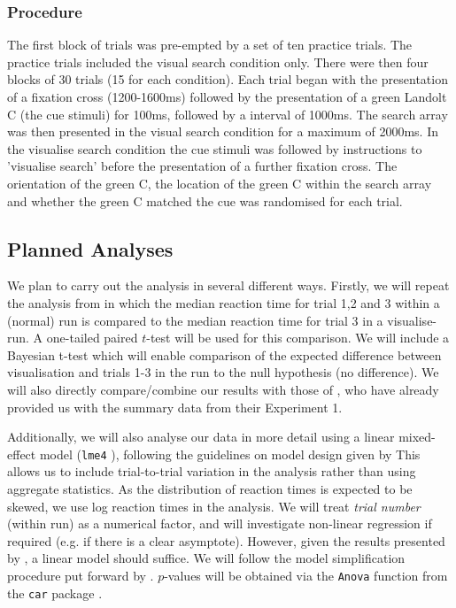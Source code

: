 \documentclass[smallextended]{svjour3}       %
\begin{document}
\subsubsection{Procedure}
The first block of trials was pre-empted by a set of ten practice trials. The practice trials included the visual search condition only. There were then four blocks of 30 trials (15 for each condition). Each trial began with the presentation of a fixation cross (1200-1600ms) followed by the presentation of a green Landolt C (the cue stimuli) for 100ms, followed by a interval of 1000ms. The search array was then presented in the visual search condition for a maximum of 2000ms. In the visualise search condition the cue stimuli was followed by instructions to 'visualise search' before the presentation of a further fixation cross. The orientation of the green C, the location of the green C within the search array and whether the green C matched the cue was randomised for each trial.

\subsection{Planned Analyses}

We plan to carry out the analysis in several different ways. Firstly, we will repeat the analysis from \cite{reinhart2015} in which the median reaction time for trial 1,2 and 3 within a (normal) run is compared to the median reaction time for trial 3 in a visualise-run. A one-tailed paired $t$-test will be used for this comparison. We will include a Bayesian t-test which will enable comparison of the expected difference between visualisation and trials 1-3 in the run to the null hypothesis (no difference). We will also directly compare/combine our results with those of \cite{reinhart2015}, who have already provided us with the summary data from their Experiment 1. 

Additionally, we will also analyse our data in more detail using a linear mixed-effect model (\texttt{lme4} \citep{bates2015, R}), following the guidelines on model design given by \cite{barr2013} This allows us to include trial-to-trial variation in the analysis rather than using aggregate statistics. As the distribution of reaction times is expected to be skewed, we use log reaction times in the analysis. We will treat \textit{trial number} (within run) as a numerical factor, and will investigate non-linear regression if required (e.g. if there is a clear asymptote). However, given the results presented by \cite{reinhart2015}, a linear model should suffice. We will follow the model simplification procedure put forward by \cite[chapter 9]{crawley2012}. $p$-values will be obtained via the \texttt{Anova} function from the \texttt{car} package \citep{fox2011}.
\end{document}
